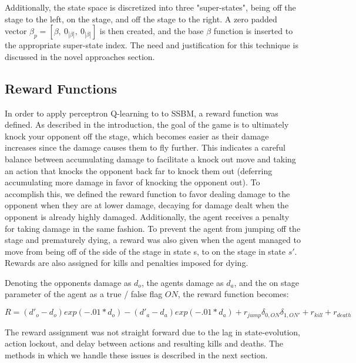 Additionally, the state space is discretized into three "super-states", being off the stage to the left, on the stage, and off the stage to the right. A zero padded vector $\beta_{p} = [\beta,~0_{|\beta|},~0_{|\beta|}]$ is then created, and the base $\beta$ function is inserted to the appropriate super-state index. The need and  justification for this technique is discussed in the novel approaches section.

\subsection{Reward Functions}

In order to apply perceptron Q-learning to to SSBM, a reward function was defined. As described in the introduction, the goal of the game is to ultimately knock your opponent off the stage, which becomes easier as their damage increases since the damage causes them to fly further. This indicates a careful balance between accumulating damage to facilitate a knock out move and taking an action that knocks the opponent back far to knock them out (deferring accumulating more damage in favor of knocking the opponent out). To accomplish this, we defined the reward function to favor dealing damage to the opponent when they are at lower damage, decaying for damage dealt when the opponent is already highly damaged. Additionally, the agent receives a penalty for taking damage in the same fashion. To prevent the agent from jumping off the stage and prematurely dying, a reward was also given when the agent managed to move from being off of the side of the stage in state s, to on the stage in state $s'$. Rewards are also assigned for kills and penalties imposed for dying.

Denoting the opponents damage as $d_o$, the agents damage as $d_a$, and the on stage parameter of the agent as a true / false flag $ON$, the reward function becomes:

$$R = (d'_o-d_o)exp(-.01*d_o) - (d'_a-d_a)exp(-.01*d_a) + r_{jump}\delta_{0,ON}\delta_{1,ON'}  + r_{kill} + r_{death}$$

The reward assignment was not straight forward due to the lag in state-evolution, action lockout, and delay between actions and resulting kills and deaths. The methods in which we handle these issues is described in the next section.
